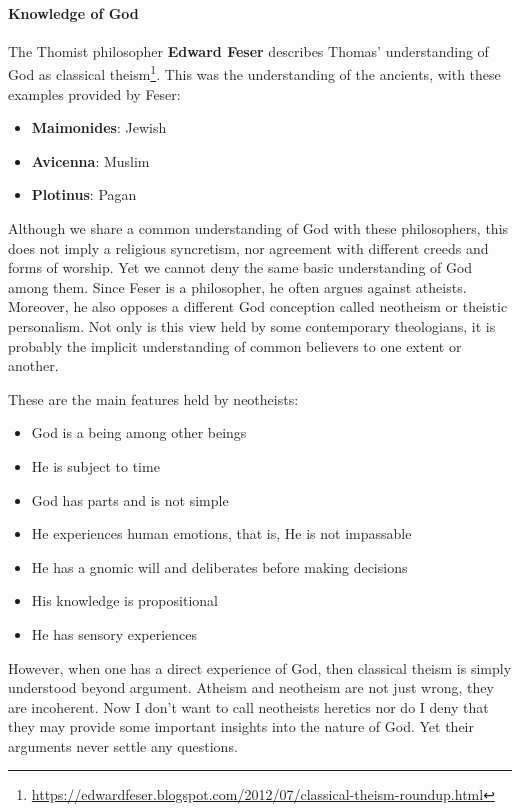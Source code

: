 \paragraph{Knowledge of God}
The Thomist philosopher \textbf{Edward Feser} describes Thomas' understanding of God as classical
theism\footnote{\url{https://edwardfeser.blogspot.com/2012/07/classical-theism-roundup.html}}. This was the understanding of the ancients, with these examples provided by Feser:

\begin{itemize}
\item \textbf{Maimonides}: Jewish 
\item \textbf{Avicenna}: Muslim 
\item \textbf{Plotinus}: Pagan 
\end{itemize}
Although we share a common understanding of God with these philosophers, this does not imply a religious syncretism, nor
agreement with different creeds and forms of worship. Yet we cannot deny the same basic understanding of God among
them. Since Feser is a philosopher, he often argues against atheists. Moreover, he also opposes a different God
conception called neotheism or theistic personalism. Not only is this view held by some contemporary theologians, it is
probably the implicit understanding of common believers to one extent or another.

These are the main features held by neotheists:

\begin{itemize}
\item God is a being among other beings 
\item He is subject to time 
\item God has parts and is not simple 
\item He experiences human emotions, that is, He is not impassable 
\item He has a gnomic will and deliberates before making decisions 
\item His knowledge is propositional 
\item He has sensory experiences 
\end{itemize}
However, when one has a direct experience of God, then classical theism is simply understood beyond argument. Atheism
and neotheism are not just wrong, they are incoherent. Now I don't want to call neotheists
heretics nor do I deny that they may provide some important insights into the nature of God. Yet their arguments never
settle any questions.


